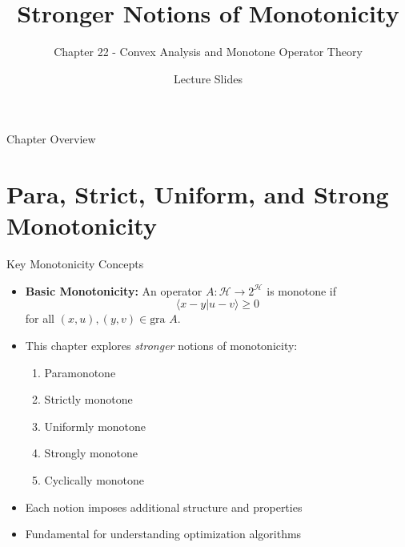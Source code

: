 \documentclass[aspectratio=169,10pt]{beamer}
\title{Stronger Notions of Monotonicity}
\subtitle{Chapter 22 - Convex Analysis and Monotone Operator Theory}
\author{Lecture Slides}
\date{}
\begin{document}
\begin{frame}
    \titlepage
\end{frame}

\begin{frame}{Chapter Overview}
    \tableofcontents
\end{frame}


\section{Para, Strict, Uniform, and Strong Monotonicity}

\begin{frame}{Key Monotonicity Concepts}
    \begin{itemize}
        \item \textbf{Basic Monotonicity:} An operator $A: \mathcal{H} \to 2^{\mathcal{H}}$ is monotone if
            $$\langle x - y | u - v \rangle \geq 0$$
            for all $(x,u), (y,v) \in \text{gra } A$.

        \item This chapter explores \emph{stronger} notions of monotonicity:
            \begin{enumerate}
                \item Paramonotone
                \item Strictly monotone
                \item Uniformly monotone
                \item Strongly monotone
                \item Cyclically monotone
            \end{enumerate}

        \item Each notion imposes additional structure and properties
        \item Fundamental for understanding optimization algorithms
    \end{itemize}
\end{frame}
\end{document}
